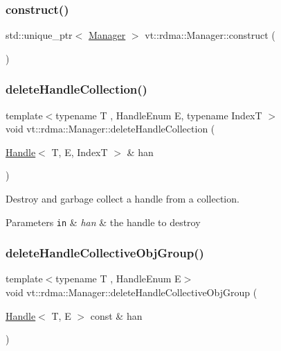 \subsubsection{\texorpdfstring{construct()}{construct()}}
{\footnotesize\ttfamily std\+::unique\+\_\+ptr$<$ \hyperlink{structvt_1_1rdma_1_1_manager}{Manager} $>$ vt\+::rdma\+::\+Manager\+::construct (\begin{DoxyParamCaption}{ }\end{DoxyParamCaption})\hspace{0.3cm}{\ttfamily [static]}}

\mbox{\label{structvt_1_1rdma_1_1_manager_a3a1f982e986d58e91837a2b1aa048468}} 
\subsubsection{\texorpdfstring{delete\+Handle\+Collection()}{deleteHandleCollection()}}
{\footnotesize\ttfamily template$<$typename T , Handle\+Enum E, typename IndexT $>$ \\
void vt\+::rdma\+::\+Manager\+::delete\+Handle\+Collection (\begin{DoxyParamCaption}\item[{\hyperlink{structvt_1_1rdma_1_1_handle}{Handle}$<$ T, E, IndexT $>$ \&}]{han }\end{DoxyParamCaption})}



Destroy and garbage collect a handle from a collection. 


\begin{DoxyParams}[1]{Parameters}
\mbox{\tt in}  & {\em han} & the handle to destroy \\
\hline
\end{DoxyParams}
\mbox{\label{structvt_1_1rdma_1_1_manager_a4219310feca011fd242e654c9ba51280}} 
\subsubsection{\texorpdfstring{delete\+Handle\+Collective\+Obj\+Group()}{deleteHandleCollectiveObjGroup()}}
{\footnotesize\ttfamily template$<$typename T , Handle\+Enum E$>$ \\
void vt\+::rdma\+::\+Manager\+::delete\+Handle\+Collective\+Obj\+Group (\begin{DoxyParamCaption}\item[{\hyperlink{structvt_1_1rdma_1_1_handle}{Handle}$<$ T, E $>$ const \&}]{han }\end{DoxyParamCaption})}



